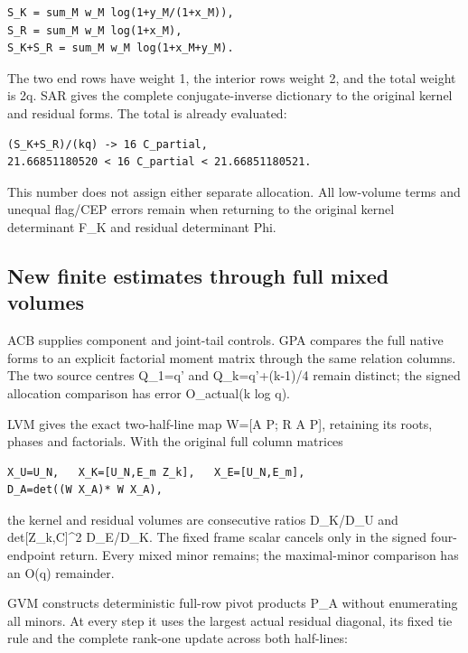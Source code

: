 \documentclass[
]{article}
\begin{document}
\begin{verbatim}
S_K = sum_M w_M log(1+y_M/(1+x_M)),
S_R = sum_M w_M log(1+x_M),
S_K+S_R = sum_M w_M log(1+x_M+y_M).
\end{verbatim}

The two end rows have weight 1, the interior rows weight 2, and the
total weight is 2q. SAR gives the complete conjugate-inverse dictionary
to the original kernel and residual forms. The total is already
evaluated:

\begin{verbatim}
(S_K+S_R)/(kq) -> 16 C_partial,
21.66851180520 < 16 C_partial < 21.66851180521.
\end{verbatim}

This number does not assign either separate allocation. All low-volume
terms and unequal flag/CEP errors remain when returning to the original
kernel determinant F\_K and residual determinant Phi.

\subsection{New finite estimates through full mixed
volumes}\label{new-finite-estimates-through-full-mixed-volumes}

ACB supplies component and joint-tail controls. GPA compares the full
native forms to an explicit factorial moment matrix through the same
relation columns. The two source centres Q\_1=q' and Q\_k=q'+(k-1)/4
remain distinct; the signed allocation comparison has error O\_actual(k
log q).

LVM gives the exact two-half-line map W={[}A P; R A P{]}, retaining its
roots, phases and factorials. With the original full column matrices

\begin{verbatim}
X_U=U_N,   X_K=[U_N,E_m Z_k],   X_E=[U_N,E_m],
D_A=det((W X_A)* W X_A),
\end{verbatim}

the kernel and residual volumes are consecutive ratios D\_K/D\_U and
\textbar det{[}Z\_k,C{]}\textbar\^{}2 D\_E/D\_K. The fixed frame scalar
cancels only in the signed four-endpoint return. Every mixed minor
remains; the maximal-minor comparison has an O(q) remainder.

GVM constructs deterministic full-row pivot products P\_A without
enumerating all minors. At every step it uses the largest actual
residual diagonal, its fixed tie rule and the complete rank-one update
across both half-lines:
\end{document}
